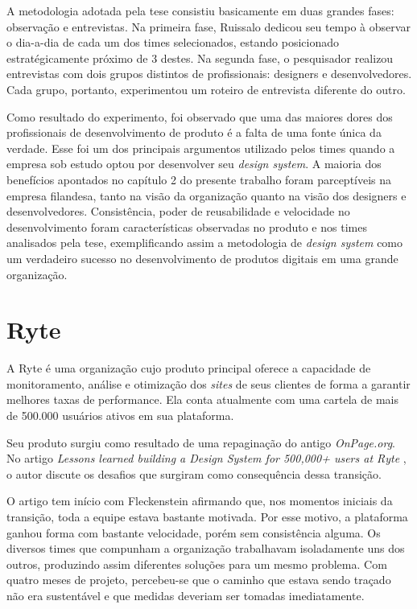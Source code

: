 A metodologia adotada pela tese consistiu basicamente em duas grandes fases: observação e entrevistas. Na primeira fase, Ruissalo dedicou seu tempo à observar o dia-a-dia de cada um dos times selecionados, estando posicionado estratégicamente próximo de 3 destes. Na segunda fase, o pesquisador realizou entrevistas com dois grupos distintos de profissionais: designers e desenvolvedores. Cada grupo, portanto, experimentou um roteiro de entrevista diferente do outro.

Como resultado do experimento, foi observado que uma das maiores dores dos profissionais de desenvolvimento de produto é a falta de uma fonte única da verdade. Esse foi um dos principais argumentos utilizado pelos times quando a empresa sob estudo optou por desenvolver seu \textit{design system}. A maioria dos benefícios apontados no capítulo 2 do presente trabalho foram parceptíveis na empresa filandesa, tanto na visão da organização quanto na visão dos designers e desenvolvedores. Consistência, poder de reusabilidade e velocidade no desenvolvimento foram características observadas no produto e nos times analisados pela tese, exemplificando assim a metodologia de \textit{design system} como um verdadeiro sucesso no desenvolvimento de produtos digitais em uma grande organização.

\section{Ryte}
\label{sec:ryte}

A Ryte é uma organização cujo produto principal oferece a capacidade de monitoramento, análise e otimização dos \textit{sites} de seus clientes de forma a garantir melhores taxas de performance. Ela conta atualmente com uma cartela de mais de 500.000 usuários ativos em sua plataforma.

Seu produto surgiu como resultado de uma repaginação do antigo \textit{OnPage.org}. No artigo \textit{Lessons learned building a Design System for 500,000+ users at Ryte} \cite{ryteDesignSystem}, o autor discute os desafios que surgiram como consequência dessa transição.

O artigo tem início com Fleckenstein afirmando que, nos momentos iniciais da transição, toda a equipe estava bastante motivada. Por esse motivo, a plataforma ganhou forma com bastante velocidade, porém sem consistência alguma. Os diversos times que compunham a organização trabalhavam isoladamente uns dos outros, produzindo assim diferentes soluções para um mesmo problema. Com quatro meses de projeto, percebeu-se que o caminho que estava sendo traçado não era sustentável e que medidas deveriam ser tomadas imediatamente.

